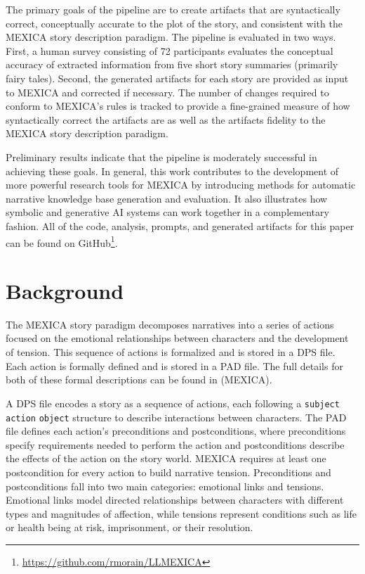 \documentclass[phd,electronic,oneside,twosidetoc,letterpaper,chaptercenter,parttop,lof]{byumsphd}
\begin{document}
The primary goals of the pipeline are to create artifacts that are syntactically correct, conceptually accurate to the plot of the story, and consistent with the MEXICA story description paradigm. The pipeline is evaluated in two ways. First, a human survey consisting of 72 participants evaluates the conceptual accuracy of extracted information from five short story summaries (primarily fairy tales). Second, the generated artifacts for each story are provided as input to MEXICA and corrected if necessary. The number of changes required to conform to MEXICA's rules is tracked to provide a fine-grained measure of how syntactically correct the artifacts are as well as the artifacts fidelity to the MEXICA story description paradigm. 

Preliminary results indicate that the pipeline is moderately successful in achieving these goals. In general, this work contributes to the development of more powerful research tools for MEXICA by introducing methods for automatic narrative knowledge base generation and evaluation. It also illustrates how symbolic and generative AI systems can work together in a complementary fashion.  All of the code, analysis, prompts, and generated artifacts for this paper can be found on GitHub\footnote{\url{https://github.com/rmorain/LLMEXICA}}.



\section{Background}

The MEXICA story paradigm decomposes narratives into a series of actions focused on the emotional relationships between characters and the development of tension. This sequence of actions is formalized and is stored in a DPS file. Each action is formally defined and is stored in a PAD file. The full details for both of these formal descriptions can be found in (MEXICA). 

A DPS file encodes a story as a sequence of actions, each following a \texttt{subject} \texttt{action} \texttt{object} structure to describe interactions between characters. The PAD file defines each action's preconditions and postconditions, where preconditions specify requirements needed to perform the action and postconditions describe the effects of the action on the story world. MEXICA requires at least one postcondition for every action to build narrative tension. Preconditions and postconditions fall into two main categories: emotional links and tensions. Emotional links model directed relationships between characters with different types and magnitudes of affection, while tensions represent conditions such as life or health being at risk, imprisonment, or their resolution.
\end{document}
